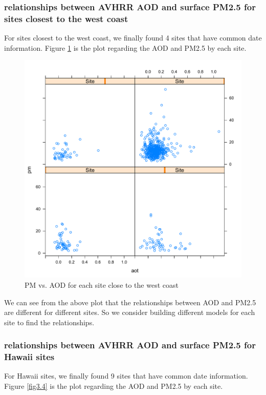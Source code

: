 \documentclass[12pt]{article}
\begin{document}
\subsubsection{relationships between AVHRR AOD and surface PM2.5 for sites closest to the west coast}

For sites closest to the west coast, we finally found 4 sites that have common date information. Figure \ref{fig3.3} is the plot regarding the AOD and PM2.5 by each site. 

\begin{figure}[!h]
\centering
\includegraphics[width=\linewidth]{3.pdf}
\caption{PM vs. AOD for each site close to the west coast}
\label{fig3.3}
\end{figure}

We can see from the above plot that the relationships between AOD and PM2.5 are different for different sites. So we consider building different models for each site to find the relationships.

\subsubsection{relationships between AVHRR AOD and surface PM2.5 for Hawaii sites}

For Hawaii sites, we finally found 9 sites that have common date information. Figure \ref{fig3.4} is the plot regarding the AOD and PM2.5 by each site. 
\end{document}
